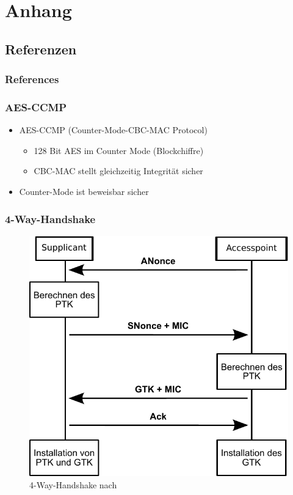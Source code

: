 \documentclass{beamer}
\begin{document}
\section{Anhang}
\subsection{Referenzen}
\begin{frame}[allowframebreaks]
\frametitle{References}


\end{frame}


\begin{frame}
\frametitle{AES-CCMP}
\begin{itemize}
	\item AES-CCMP (Counter-Mode-CBC-MAC Protocol) 
	\begin{itemize}
		\item 128 Bit AES im Counter Mode (Blockchiffre)
		\item CBC-MAC stellt gleichzeitig Integrität sicher
	\end{itemize}
	\item Counter-Mode ist beweisbar sicher \cite{bellare}
\end{itemize}
\end{frame}

\begin{frame}
\frametitle{4-Way-Handshake}
\begin{figure}
	\includegraphics[width=0.5\linewidth]{figures/4-way-handshake.pdf}
	\caption{4-Way-Handshake nach \cite{ieee802.11}}
\end{figure}
\end{frame}
\end{document}
